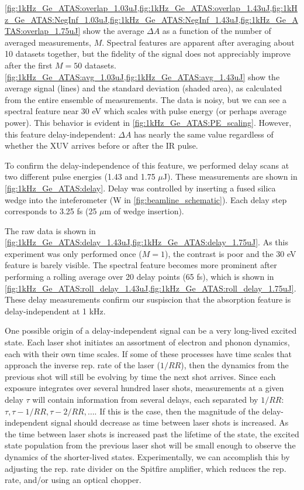 \cref{fig:1kHz_Ge_ATAS:overlap_1.03uJ,fig:1kHz_Ge_ATAS:overlap_1.43uJ,fig:1kHz_Ge_ATAS:NegInf_1.03uJ,fig:1kHz_Ge_ATAS:NegInf_1.43uJ,fig:1kHz_Ge_ATAS:overlap_1.75uJ} show the average $\Delta A$ as a function of the number of averaged measurements, $M$. Spectral features are apparent after averaging about 10 datasets together, but the fidelity of the signal does not appreciably improve after the first $M=50$ datasets. \cref{fig:1kHz_Ge_ATAS:avg_1.03uJ,fig:1kHz_Ge_ATAS:avg_1.43uJ} show the average signal (lines) and the standard deviation (shaded area), as calculated from the entire ensemble of measurements. The data is noisy, but we can see a spectral feature near 30 eV which scales with pulse energy (or perhaps average power). This behavior is evident in \cref{fig:1kHz_Ge_ATAS:PE_scaling}. However, this feature delay-independent: $\Delta A$ has nearly the same value regardless of whether the XUV arrives before or after the IR pulse.

To confirm the delay-independence of this feature, we performed delay scans at two different pulse energies (1.43 and 1.75 $\mu$J). These measurements are shown in \cref{fig:1kHz_Ge_ATAS:delay}. Delay was controlled by inserting a fused silica wedge into the inteferometer (W in \cref{fig:beamline_schematic}). Each delay step corresponds to 3.25 fs (25 $\mu$m of wedge insertion).

The raw data is shown in \cref{fig:1kHz_Ge_ATAS:delay_1.43uJ,fig:1kHz_Ge_ATAS:delay_1.75uJ}. As this experiment was only performed once ($M=1$), the contrast is poor and the 30 eV feature is barely visible. The spectral feature becomes more prominent after performing a rolling average over 20 delay points (65 fs), which is shown in \cref{fig:1kHz_Ge_ATAS:roll_delay_1.43uJ,fig:1kHz_Ge_ATAS:roll_delay_1.75uJ}. These delay measurements confirm our suspiscion that the absorption feature is delay-independent at 1 kHz.

One possible origin of a delay-independent signal can be a very long-lived excited state. Each laser shot initiates an assortment of electron and phonon dynamics, each with their own time scales. If some of these processes have time scales that approach the inverse rep. rate of the laser ($1/RR$), then the dynamics from the previous shot will still be evolving by time the next shot arrives. Since each exposure integrates over several hundred laser shots, measurements at a given delay $\tau$ will contain information from several delays, each separated by $1/RR$: $\tau, \tau-1/RR, \tau-2/RR, \dots$. If this is the case, then the magnitude of the delay-independent signal should decrease as time between laser shots is increased. As the time between laser shots is increased past the lifetime of the state, the excited state population from the previous laser shot will be small enough to observe the dynamics of the shorter-lived states. Experimentally, we can accomplish this by adjusting the rep. rate divider on the Spitfire amplifier, which reduces the rep. rate, and/or using an optical chopper.

